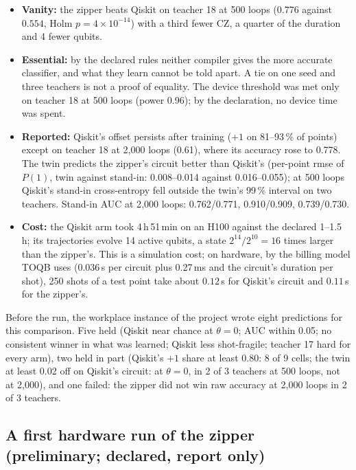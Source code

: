 \documentclass[11pt]{article}
\begin{document}
\begin{itemize}
\item \textbf{Vanity:} the zipper beats Qiskit on teacher 18 at 500 loops ($0.776$ against $0.554$, Holm
$p = 4\times10^{-14}$) with a third fewer CZ, a quarter of the duration and 4 fewer qubits.
\item \textbf{Essential:} by the declared rules neither compiler gives the more accurate classifier, and what they
learn cannot be told apart. A tie on one seed and three teachers is not a proof of equality. The device threshold
was met only on teacher 18 at 500 loops (power 0.96); by the declaration, no device time was spent.
\item \textbf{Reported:} Qiskit's offset persists after training ($+1$ on 81--93\,\% of points) except on teacher 18 at
2{,}000 loops (0.61), where its accuracy rose to 0.778. The twin predicts the zipper's circuit better than Qiskit's
(per-point rmse of $P(1)$, twin against stand-in: 0.008--0.014 against 0.016--0.055); at 500 loops Qiskit's stand-in
cross-entropy fell outside the twin's 99\,\% interval on two teachers. Stand-in AUC at 2{,}000 loops: 0.762/0.771,
0.910/0.909, 0.739/0.730.
\item \textbf{Cost:} the Qiskit arm took 4\,h\,51\,min on an H100 against the declared 1--1.5\,h; its trajectories
evolve 14 active qubits, a state $2^{14}/2^{10} = 16$ times larger than the zipper's. This is a simulation cost; on hardware, by the billing model TOQB uses
(0.036\,s per circuit plus 0.27\,ms and the circuit's duration per shot), 250 shots of a test point take about
$0.12$\,s for Qiskit's circuit and $0.11$\,s for the zipper's.
\end{itemize}

Before the run, the workplace instance of the project wrote eight predictions for this comparison. Five held
(Qiskit near chance at $\theta = 0$; AUC within 0.05; no consistent winner in what was learned; Qiskit less
shot-fragile; teacher 17 hard for every arm), two held in part (Qiskit's $+1$ share at least 0.80: 8 of 9 cells; the
twin at least 0.02 off on Qiskit's circuit: at $\theta = 0$, in 2 of 3 teachers at 500 loops, not at 2{,}000), and one failed: the zipper did not win raw accuracy at
2{,}000 loops in 2 of 3 teachers.

\subsection{A first hardware run of the zipper (preliminary; declared, report only)}
\label{sec:kingston}
\end{document}
